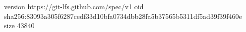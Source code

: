 version https://git-lfs.github.com/spec/v1
oid sha256:83093a305f6287cedf33d10bfa0734dbb28fa5b37565b5311df5ad39f39f460e
size 43840
